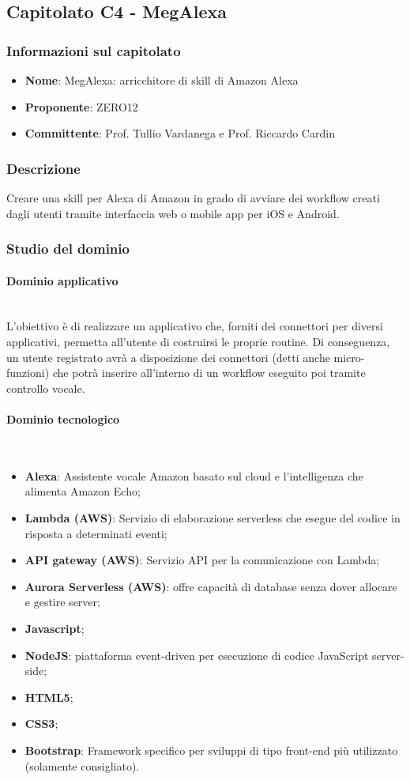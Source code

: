 \subsection{Capitolato C4 - MegAlexa}
\subsubsection{Informazioni sul capitolato}
\begin{itemize}
    \item \textbf{Nome}: MegAlexa: arricchitore di skill di Amazon Alexa
	\item \textbf{Proponente}: ZERO12
	\item \textbf{Committente}: Prof. Tullio Vardanega e Prof. Riccardo Cardin
\end{itemize}
\subsubsection{Descrizione}
Creare una skill per Alexa di Amazon in grado di avviare dei workflow creati dagli utenti tramite interfaccia web o mobile app per iOS e Android.
\subsubsection{Studio del dominio}
\paragraph{Dominio applicativo}\mbox{}\\
L'obiettivo è di realizzare un applicativo che, forniti dei connettori per diversi applicativi, permetta all’utente di costruirsi le proprie routine. Di conseguenza, un utente registrato avrà a disposizione dei connettori (detti anche micro-funzioni) che potrà inserire all’interno di un workflow eseguito poi tramite controllo vocale.
\paragraph{Dominio tecnologico}\mbox{}\\
\begin{itemize}
    \item \textbf{Alexa}: Assistente vocale Amazon basato sul cloud e l'intelligenza che alimenta Amazon Echo;
    \item \textbf{Lambda (AWS)}: Servizio di elaborazione serverless che esegue del codice in risposta a determinati eventi;
    \item \textbf{API gateway (AWS)}: Servizio API per la comunicazione con Lambda;
    \item \textbf{Aurora Serverless (AWS)}: offre capacità di database senza dover allocare e gestire server;
    \item \textbf{Javascript};
    \item \textbf{NodeJS}: piattaforma event-driven per esecuzione di codice JavaScript server-side;
    \item \textbf{HTML5};
    \item \textbf{CSS3};
    \item \textbf{Bootstrap}: Framework specifico per sviluppi di tipo front-end più utilizzato (solamente consigliato).
\end{itemize}
